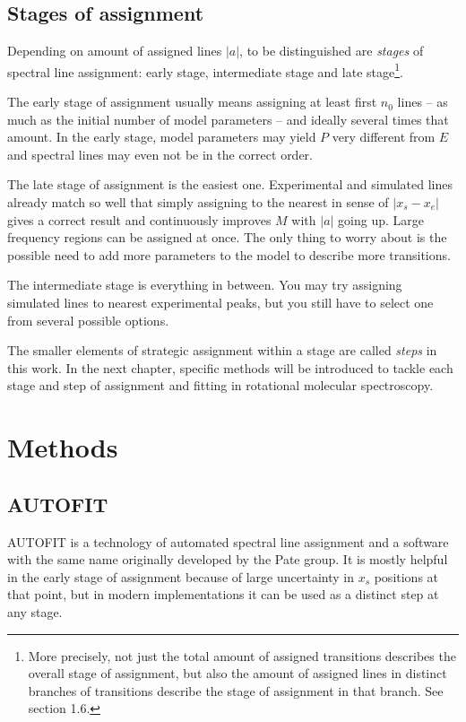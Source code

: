 \documentclass[11pt]{article}
\begin{document}
\subsection{Stages of assignment}

Depending on amount of assigned lines $|a|$, to be distinguished are \emph{stages} of spectral line assignment: early stage, intermediate stage and late stage\footnote{More precisely, not just the total amount of assigned transitions describes the overall stage of assignment, but also the amount of assigned lines in distinct branches of transitions describe the stage of assignment in that branch. See section 1.6.}.

The early stage of assignment usually means assigning at least first $n_0$ lines -- as much as the initial number of model parameters -- and ideally several times that amount. In the early stage, model parameters may yield $P$ very different from $E$ and spectral lines may even not be in the correct order. 

The late stage of assignment is the easiest one. Experimental and simulated lines already match so well that simply assigning to the nearest in sense of $|x_s - x_e|$ gives a correct result and continuously improves $M$ with $|a|$ going up. Large frequency regions can be assigned at once. The only thing to worry about is the possible need to add more parameters to the model to describe more transitions.  

The intermediate stage is everything in between. You may try assigning simulated lines to nearest experimental peaks, but you still have to select one from several possible options.

The smaller elements of strategic assignment within a stage are called \emph{steps} in this work. In the next chapter, specific methods will be introduced to tackle each stage and step of assignment and fitting in rotational molecular spectroscopy.

\section{Methods}


\subsection{AUTOFIT}

AUTOFIT is a technology of automated spectral line assignment and a software with the same name originally developed by the Pate group. It is mostly helpful in the early stage of assignment because of large uncertainty in $x_s$ positions at that point, but in modern implementations it can be used as a distinct step at any stage.
\end{document}
